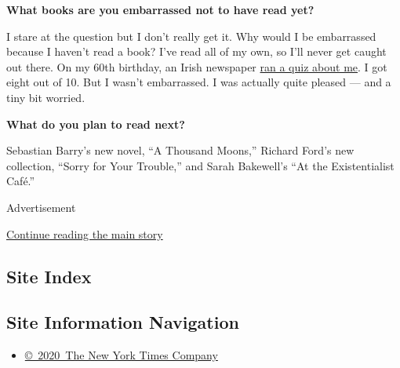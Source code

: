 \textbf{What books are you embarrassed not to have read yet?}

I stare at the question but I don't really get it. Why would I be
embarrassed because I haven't read a book? I've read all of my own, so
I'll never get caught out there. On my 60th birthday, an Irish newspaper
\href{https://www.thejournal.ie/roddy-doyle-quiz-3999776-May2018/}{ran a
quiz about me}. I got eight out of 10. But I wasn't embarrassed. I was
actually quite pleased --- and a tiny bit worried.

\textbf{What do you plan to read next?}

Sebastian Barry's new novel, ``A Thousand Moons,'' Richard Ford's new
collection, ``Sorry for Your Trouble,'' and Sarah Bakewell's ``At the
Existentialist Café.''

Advertisement

\protect\hyperlink{after-bottom}{Continue reading the main story}

\hypertarget{site-index}{%
\subsection{Site Index}\label{site-index}}

\hypertarget{site-information-navigation}{%
\subsection{Site Information
Navigation}\label{site-information-navigation}}

\begin{itemize}
\tightlist
\item
  \href{https://help.nytimes3xbfgragh.onion/hc/en-us/articles/115014792127-Copyright-notice}{©~2020~The
  New York Times Company}
\end{itemize}

